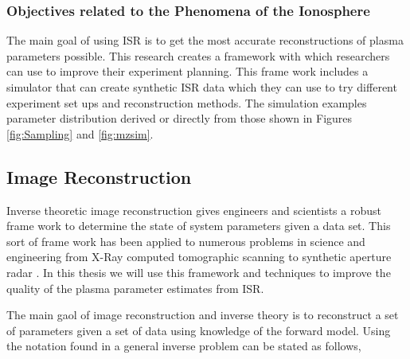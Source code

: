 %
\subsubsection{Objectives related to the Phenomena of the Ionosphere}
The main goal of using ISR is to get the most accurate reconstructions of plasma parameters possible. This research creates a framework with which researchers can use to improve their experiment planning. This frame work includes a simulator that can create synthetic ISR data which they can use to try different experiment set ups and reconstruction methods. The simulation examples parameter distribution derived or directly from those shown in Figures \ref{fig:Sampling} and \ref{fig:mzsim}.

\subsection{Image Reconstruction}
\label{sec:imgrec}
Inverse theoretic image reconstruction gives engineers and scientists a robust frame work to determine the state of system parameters given a data set. This sort of frame work has been applied to numerous problems in science and engineering from X-Ray computed tomographic scanning \cite{kak1988principles} to synthetic aperture radar \cite{1456966}. In this thesis we will use this framework and techniques to improve the quality of the plasma parameter estimates from ISR.

The main gaol of image reconstruction and inverse theory is to reconstruct a set of parameters given a set of data using knowledge of the forward model. Using the notation found in \cite{menke2012geophysical} a general inverse problem can be stated as follows,

